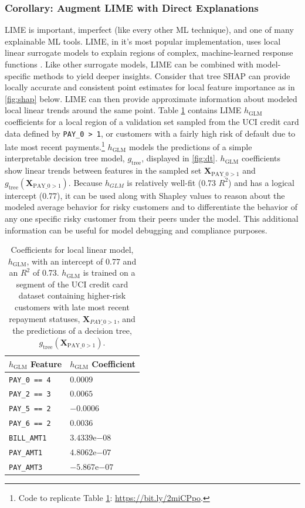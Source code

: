 \documentclass{article}
\begin{document}
\subsubsection{Corollary: Augment LIME with Direct Explanations} LIME is important, imperfect (like every other ML technique), and one of many explainable ML tools. LIME, in it's most popular implementation, uses local linear surrogate models to explain regions of complex, machine-learned response functions \cite{lime}. Like other surrogate models, LIME can be combined with model-specific methods to yield deeper insights. Consider that tree SHAP can provide locally accurate and consistent point estimates for local feature importance as in \ref{fig:shap} below. LIME can then provide approximate information about modeled local linear trends around the same point. Table \ref{tab:lime} contains LIME $h_{\text{GLM}}$ coefficients for a local region of a validation set sampled from the UCI credit card data defined by \texttt{PAY\_0 > 1}, or customers with a fairly high risk of default due to late most recent payments.\footnote{\scriptsize{Code to replicate Table \ref{tab:lime}: \url{https://bit.ly/2miCPpo}.}} $h_{\text{GLM}}$ models the predictions of a simple interpretable decision tree model, $g_{\text{tree}}$, displayed in \ref{fig:dt}. $h_{\text{GLM}}$ coefficients show linear trends between features in the sampled set $\mathbf{X}_{\text{PAY\_0} > 1}$ and $g_{\text{tree}}(\mathbf{X}_{\text{PAY\_0}> 1})$. Because $h_{GLM}$ is relatively well-fit (0.73 $R^2$) and has a logical intercept (0.77), it can be used along with Shapley values to reason about the modeled average behavior for risky customers and to differentiate the behavior of any one specific risky customer from their peers under the model. This additional information can be useful for model debugging and compliance purposes.

\begin{table}
  	\caption{Coefficients for local linear model, $h_{\text{GLM}}$, with an intercept of 0.77 and an $R^2$ of 0.73. $h_{\text{GLM}}$ is trained on a segment of the UCI credit card dataset containing higher-risk customers with late most recent repayment statuses, $\mathbf{X}_{PAY \_ 0 > 1}$, and the predictions of a decision tree, $g_{\text{tree}}(\mathbf{X}_{\text{PAY\_0} > 1})$.\\}
  	\label{tab:lime}
  	\centering
  	\begin{tabular}{ll}
    	\toprule
    	$h_{\text{GLM}}$ Feature & $h_{\text{GLM}}$ Coefficient \\
    	\midrule
		\texttt{PAY\_0 == 4} & $0.0009$ \\
		\texttt{PAY\_2 == 3} & $0.0065$ \\
		\texttt{PAY\_5 == 2} & $-0.0006$ \\
		\texttt{PAY\_6 == 2} & $0.0036$ \\
		\texttt{BILL\_AMT1} & $3.4339\mathrm{e}{-08}$ \\
		\texttt{PAY\_AMT1} & $4.8062\mathrm{e}{-07}$ \\
		\texttt{PAY\_AMT3} & $-5.867\mathrm{e}{-07}$ \\
    	\bottomrule
  \end{tabular}
\end{table}
\end{document}
